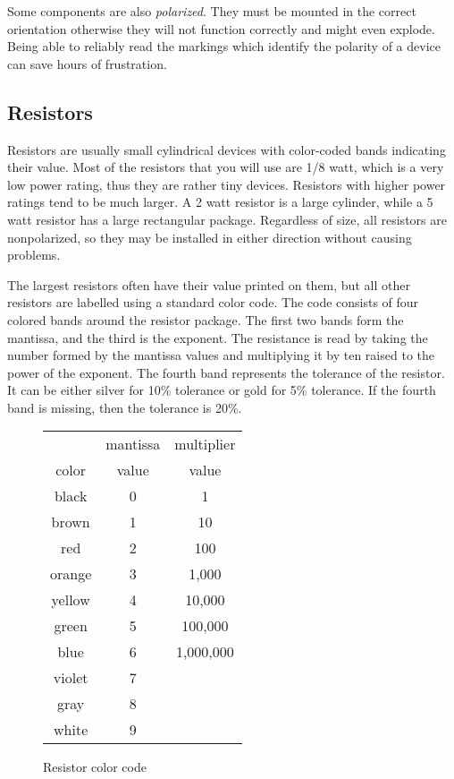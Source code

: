 Some components are also {\it polarized}. They must be mounted in the
correct orientation otherwise they will not function correctly and
might even explode. Being able to reliably read the markings which
identify the polarity of a device can save hours of frustration.

\subsection{Resistors}

Resistors are usually small cylindrical devices with color-coded bands
indicating their value. Most of the resistors that you will use are
1/8 watt, which is a very low power rating, thus they are rather tiny
devices. Resistors with higher power ratings tend to be much larger. A
2 watt resistor is a large cylinder, while a 5 watt resistor has a
large rectangular package. Regardless of size, all resistors are
nonpolarized, so they may be installed in either direction without
causing problems.

The largest resistors often have their value printed on them, but all
other resistors are labelled using a standard color code. The code
consists of four colored bands around the resistor package. The first
two bands form the mantissa, and the third is the exponent. The
resistance is read by taking the number formed by the mantissa values
and multiplying it by ten raised to the power of the exponent. The
fourth band represents the tolerance of the resistor. It can be either
silver for 10\% tolerance or gold for 5\% tolerance. If the fourth band
is missing, then the tolerance is 20\%.

\begin{figure}[htbp]
 \begin{center}
 \begin{tabular}{c|cc}
	&	mantissa&multiplier\\
	color&	value&	value\\ \hline
	black&	0&	1\\
	brown&	1&	10\\
	red&	2&	100\\
	orange&	3&	1,000\\
	yellow&	4&	10,000\\
	green&	5&	100,000\\
	blue&	6&	1,000,000\\
	violet&	7\\
	gray&	8\\
	white&	9
 \end{tabular}
 \end{center}
 \caption{Resistor color code}
 \label{resistorcolor}
\end{figure}

